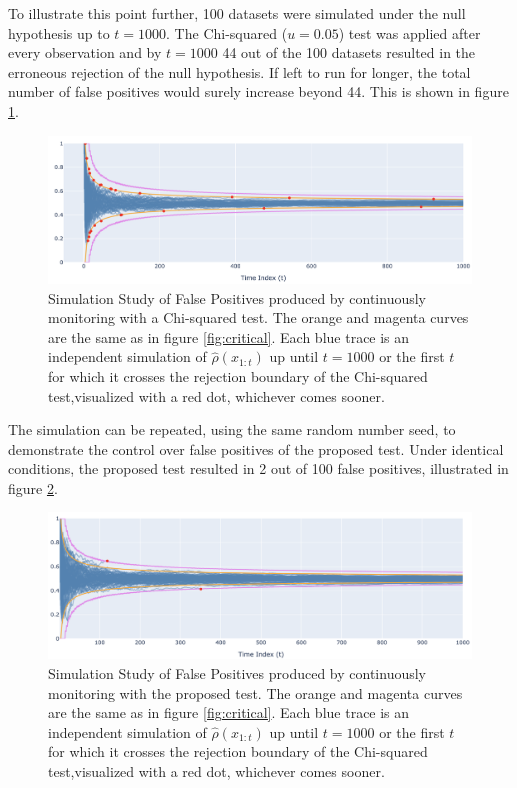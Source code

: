 \documentclass[11pt]{article}
\begin{document}
  To illustrate this point further, 100 datasets were simulated under the null hypothesis up to $t=1000$. The Chi-squared ($u=0.05$) test was applied after every observation and by $t=1000$ 44 out of the 100 datasets resulted in the erroneous rejection of the null hypothesis. If left to run for longer, the total number of false positives would surely increase beyond 44. This is shown in figure \ref{fig:chi_fp}.
  \begin{figure}[h!]
  \centering
  \includegraphics[scale=0.5]{images/chi_fp.png}
  \caption{Simulation Study of False Positives produced by continuously monitoring with a Chi-squared test. The orange and magenta curves are the same as in figure \ref{fig:critical}. Each blue trace is an independent simulation of $\hat{\rho}(x_{1:t})$ up until $t=1000$ or the first $t$ for which it crosses the rejection boundary of the Chi-squared test,visualized with a red dot, whichever comes sooner. }
    \label{fig:chi_fp}
  \end{figure}
  The simulation can be repeated, using the same random number seed, to demonstrate the control over false positives of the proposed test. Under identical conditions, the proposed test resulted in 2 out of 100 false positives, illustrated in figure \ref{fig:ssrm_fp}.
    \begin{figure}[H]
  \centering
  \includegraphics[scale=0.5]{images/ssrm_fp.png}
  \caption{Simulation Study of False Positives produced by continuously monitoring with the proposed test. The orange and magenta curves are the same as in figure \ref{fig:critical}. Each blue trace is an independent simulation of $\hat{\rho}(x_{1:t})$ up until $t=1000$ or the first $t$ for which it crosses the rejection boundary of the Chi-squared test,visualized with a red dot, whichever comes sooner. }
    \label{fig:ssrm_fp}
  \end{figure}
\end{document}
